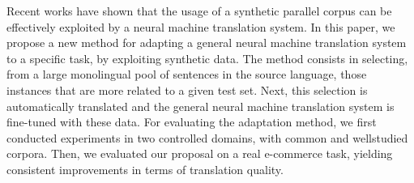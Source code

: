 Recent works have shown that the usage of a synthetic parallel corpus can be effectively exploited by a neural machine translation system. In this paper, we propose a new method for adapting a general neural machine translation system to a specific task, by exploiting synthetic data. The method consists in selecting, from a large monolingual pool of sentences in the source language, those instances that are more related to a given test set. Next, this selection is automatically translated and the general neural machine translation system is fine-tuned with these data. For evaluating the adaptation method, we first conducted experiments in two controlled domains, with common and wellstudied corpora. Then, we evaluated our proposal on a real e-commerce task, yielding consistent improvements in terms of translation quality.
